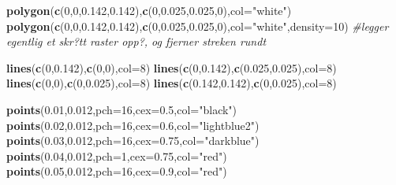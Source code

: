 \documentclass[]{article}
\newenvironment{Shaded}{\begin{snugshade}}{\end{snugshade}}
\newcommand{\CommentTok}[1]{\textcolor[rgb]{0.56,0.35,0.01}{\textit{#1}}}
\newcommand{\DataTypeTok}[1]{\textcolor[rgb]{0.13,0.29,0.53}{#1}}
\newcommand{\DecValTok}[1]{\textcolor[rgb]{0.00,0.00,0.81}{#1}}
\newcommand{\FloatTok}[1]{\textcolor[rgb]{0.00,0.00,0.81}{#1}}
\newcommand{\KeywordTok}[1]{\textcolor[rgb]{0.13,0.29,0.53}{\textbf{#1}}}
\newcommand{\NormalTok}[1]{#1}
\newcommand{\StringTok}[1]{\textcolor[rgb]{0.31,0.60,0.02}{#1}}
\begin{document}
\begin{Shaded}
\begin{Highlighting}[]
\KeywordTok{polygon}\NormalTok{(}\KeywordTok{c}\NormalTok{(}\DecValTok{0}\NormalTok{,}\DecValTok{0}\NormalTok{,}\FloatTok{0.142}\NormalTok{,}\FloatTok{0.142}\NormalTok{),}\KeywordTok{c}\NormalTok{(}\DecValTok{0}\NormalTok{,}\FloatTok{0.025}\NormalTok{,}\FloatTok{0.025}\NormalTok{,}\DecValTok{0}\NormalTok{),}\DataTypeTok{col=}\StringTok{"white"}\NormalTok{)}
\KeywordTok{polygon}\NormalTok{(}\KeywordTok{c}\NormalTok{(}\DecValTok{0}\NormalTok{,}\DecValTok{0}\NormalTok{,}\FloatTok{0.142}\NormalTok{,}\FloatTok{0.142}\NormalTok{),}\KeywordTok{c}\NormalTok{(}\DecValTok{0}\NormalTok{,}\FloatTok{0.025}\NormalTok{,}\FloatTok{0.025}\NormalTok{,}\DecValTok{0}\NormalTok{),}\DataTypeTok{col=}\StringTok{"white"}\NormalTok{,}\DataTypeTok{density=}\DecValTok{10}\NormalTok{) }\CommentTok{#legger egentlig et skr?tt raster opp?, og fjerner streken rundt}

\KeywordTok{lines}\NormalTok{(}\KeywordTok{c}\NormalTok{(}\DecValTok{0}\NormalTok{,}\FloatTok{0.142}\NormalTok{),}\KeywordTok{c}\NormalTok{(}\DecValTok{0}\NormalTok{,}\DecValTok{0}\NormalTok{),}\DataTypeTok{col=}\DecValTok{8}\NormalTok{)}
\KeywordTok{lines}\NormalTok{(}\KeywordTok{c}\NormalTok{(}\DecValTok{0}\NormalTok{,}\FloatTok{0.142}\NormalTok{),}\KeywordTok{c}\NormalTok{(}\FloatTok{0.025}\NormalTok{,}\FloatTok{0.025}\NormalTok{),}\DataTypeTok{col=}\DecValTok{8}\NormalTok{)}
\KeywordTok{lines}\NormalTok{(}\KeywordTok{c}\NormalTok{(}\DecValTok{0}\NormalTok{,}\DecValTok{0}\NormalTok{),}\KeywordTok{c}\NormalTok{(}\DecValTok{0}\NormalTok{,}\FloatTok{0.025}\NormalTok{),}\DataTypeTok{col=}\DecValTok{8}\NormalTok{)}
\KeywordTok{lines}\NormalTok{(}\KeywordTok{c}\NormalTok{(}\FloatTok{0.142}\NormalTok{,}\FloatTok{0.142}\NormalTok{),}\KeywordTok{c}\NormalTok{(}\DecValTok{0}\NormalTok{,}\FloatTok{0.025}\NormalTok{),}\DataTypeTok{col=}\DecValTok{8}\NormalTok{)}

\KeywordTok{points}\NormalTok{(}\FloatTok{0.01}\NormalTok{,}\FloatTok{0.012}\NormalTok{,}\DataTypeTok{pch=}\DecValTok{16}\NormalTok{,}\DataTypeTok{cex=}\FloatTok{0.5}\NormalTok{,}\DataTypeTok{col=}\StringTok{"black"}\NormalTok{)}
\KeywordTok{points}\NormalTok{(}\FloatTok{0.02}\NormalTok{,}\FloatTok{0.012}\NormalTok{,}\DataTypeTok{pch=}\DecValTok{16}\NormalTok{,}\DataTypeTok{cex=}\FloatTok{0.6}\NormalTok{,}\DataTypeTok{col=}\StringTok{"lightblue2"}\NormalTok{)}
\KeywordTok{points}\NormalTok{(}\FloatTok{0.03}\NormalTok{,}\FloatTok{0.012}\NormalTok{,}\DataTypeTok{pch=}\DecValTok{16}\NormalTok{,}\DataTypeTok{cex=}\FloatTok{0.75}\NormalTok{,}\DataTypeTok{col=}\StringTok{"darkblue"}\NormalTok{)}
\KeywordTok{points}\NormalTok{(}\FloatTok{0.04}\NormalTok{,}\FloatTok{0.012}\NormalTok{,}\DataTypeTok{pch=}\DecValTok{1}\NormalTok{,}\DataTypeTok{cex=}\FloatTok{0.75}\NormalTok{,}\DataTypeTok{col=}\StringTok{"red"}\NormalTok{)}
\KeywordTok{points}\NormalTok{(}\FloatTok{0.05}\NormalTok{,}\FloatTok{0.012}\NormalTok{,}\DataTypeTok{pch=}\DecValTok{16}\NormalTok{,}\DataTypeTok{cex=}\FloatTok{0.9}\NormalTok{,}\DataTypeTok{col=}\StringTok{"red"}\NormalTok{)}


\end{Highlighting}
\end{Shaded}
\end{document}
